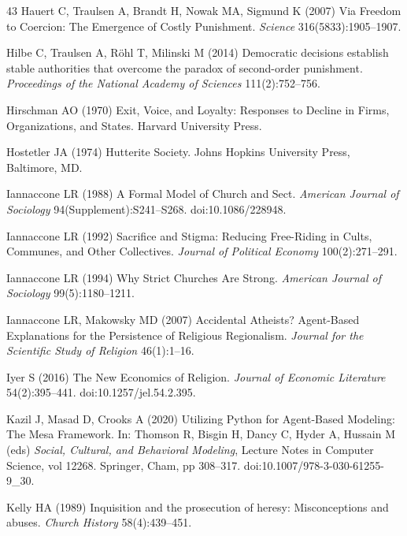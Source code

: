 \documentclass[12pt]{article}
\begin{document}
\begin{thebibliography}{43}
Hauert C, Traulsen A, Brandt H, Nowak MA, Sigmund K (2007) Via Freedom to Coercion: The Emergence of Costly Punishment. \textit{Science} 316(5833):1905--1907.

Hilbe C, Traulsen A, R\"ohl T, Milinski M (2014) Democratic decisions establish stable authorities that overcome the paradox of second-order punishment. \textit{Proceedings of the National Academy of Sciences} 111(2):752--756.

Hirschman AO (1970) Exit, Voice, and Loyalty: Responses to Decline in Firms, Organizations, and States. Harvard University Press.

Hostetler JA (1974) Hutterite Society. Johns Hopkins University Press, Baltimore, MD.

Iannaccone LR (1988) A Formal Model of Church and Sect. \textit{American Journal of Sociology} 94(Supplement):S241--S268. doi:10.1086/228948.

Iannaccone LR (1992) Sacrifice and Stigma: Reducing Free-Riding in Cults, Communes, and Other Collectives. \textit{Journal of Political Economy} 100(2):271--291.

Iannaccone LR (1994) Why Strict Churches Are Strong. \textit{American Journal of Sociology} 99(5):1180--1211.

Iannaccone LR, Makowsky MD (2007) Accidental Atheists? Agent-Based Explanations for the Persistence of Religious Regionalism. \textit{Journal for the Scientific Study of Religion} 46(1):1--16.

Iyer S (2016) The New Economics of Religion. \textit{Journal of Economic Literature} 54(2):395--441. doi:10.1257/jel.54.2.395.

Kazil J, Masad D, Crooks A (2020) Utilizing Python for Agent-Based Modeling: The Mesa Framework. In: Thomson R, Bisgin H, Dancy C, Hyder A, Hussain M (eds) \textit{Social, Cultural, and Behavioral Modeling}, Lecture Notes in Computer Science, vol 12268. Springer, Cham, pp 308--317. doi:10.1007/978-3-030-61255-9\_30.

Kelly HA (1989) Inquisition and the prosecution of heresy: Misconceptions and abuses. \textit{Church History} 58(4):439--451.


\end{thebibliography}
\end{document}
